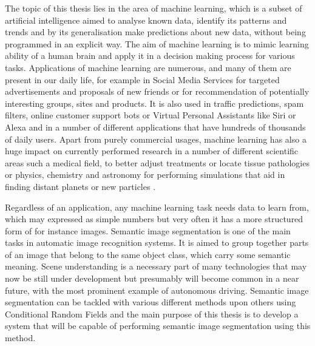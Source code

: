 The topic of this thesis lies in the area of machine learning, which is a subset of artificial intelligence aimed to analyse known data, identify its patterns and trends and by its generalisation make predictions about new data, without being programmed in an explicit way. The aim of machine learning is to mimic learning ability of a human brain and apply it in a decision making process for various tasks. Applications of machine learning are numerous, and many of them are present in our daily life, for example in Social Media Services for targeted advertisements and proposals of new friends or for recommendation of potentially interesting groups, sites and products. It is also used in traffic predictions, spam filters, online customer support bots or Virtual Personal Assistants like Siri or Alexa and in a number of different applications that have hundreds of thousands of daily users. Apart from purely commercial usages, machine learning has also a huge impact on currently performed research in a number of different scientific areas such a medical field, to better adjust treatments or locate tissue pathologies or physics, chemistry and astronomy for performing simulations that aid in finding distant planets or new particles \cite{ml_uses}. 

Regardless of an application, any machine learning task needs data to learn from, which may expressed as simple numbers but very often it has a more structured form of for instance images. Semantic image segmentation is one of the main tasks in automatic image recognition systems. It is aimed to group together parts of an image that belong to the same object class, which carry some semantic meaning. Scene understanding is a necessary part of many technologies that may now be still under development but presumably will become common in a near future, with the most prominent example of autonomous driving. Semantic image segmentation can be tackled with various different methods upon others using Conditional Random Fields and the main purpose of this thesis is to develop a system that will be capable of performing semantic image segmentation using this method.
